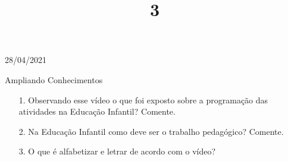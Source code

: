 \documentclass{SchoolBook}
\begin{document}
    \begin{day}{28/04/2021}
        \title{3}{Ampliando Conhecimentos}
        
        \begin{enumerate}
            \item[1.] Observando esse vídeo o que foi exposto sobre a programação das atividades na Educação Infantil? Comente.
            \response{******************}
            
            \item[2.] Na Educação Infantil como deve ser o trabalho pedagógico? Comente.
            \response{******************}
            
            \item[3.] O que é alfabetizar e letrar de acordo com o vídeo?
            \response{******************}
        \end{enumerate}
    \end{day}
\end{document}
